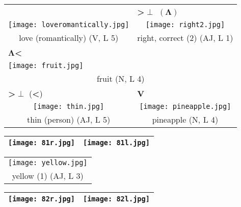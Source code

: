 \documentclass{tufte-book}
\newcommand{\sansnormal}{\sffamily\selectfont}
\begin{document}
\begin{fullwidth}
\begin{table*}[h!]
\begin{tabular}{ccc}
   
   
  \end{tabular}
\end{table*} 
\newpage

\begin{table*}[h!]
\begin{tabular}{cc}
&\multicolumn{1}{l}{\textbf{>}$\pmb\perp$ $(\mathbf\Lambda)$}  \\
\texttt{[image: loveromantically.jpg]}&\texttt{[image: right2.jpg]}\\
   love (romantically) (V, L 5)&right, correct (2) (AJ, L 1)\\
   \multicolumn{1}{l}{$\mathbf\Lambda$\textbf{<}}&  \\
   \multicolumn{2}{l}{\texttt{[image: fruit.jpg]}}\\
   \multicolumn{2}{c}{fruit (N, L 4)}\\
   \multicolumn{1}{l}{\textbf{>}$\pmb\perp$ (\textbf{<})} &\multicolumn{1}{l}{{\sansnormal\textbf{V}}} \\
   \texttt{[image: thin.jpg]}&\texttt{[image: pineapple.jpg]}\\
   thin (person) (AJ, L 5)&pineapple (N, L 4)\\
   
   
  
   
   
  \end{tabular}
\end{table*}


     \begin{table}[h!]
\begin{tabular}{|c|c|}
\hline
\texttt{[image: 81r.jpg]} & \texttt{[image: 81l.jpg]}\\
\hline
\end{tabular}
\label{page:81}
\end{table}

 \begin{table*}[h!]
\begin{tabular}{c}
   \texttt{[image: yellow.jpg]}\\
   yellow (1) (AJ, L 3)\\%
  
  \end{tabular}
\end{table*}
\newpage
     \begin{table}[h!]
\begin{tabular}{|c|c|}
\hline
\texttt{[image: 82r.jpg]} & \texttt{[image: 82l.jpg]}\\
\hline
\end{tabular}
\label{page:82}
\end{table}


\end{fullwidth}
\end{document}
